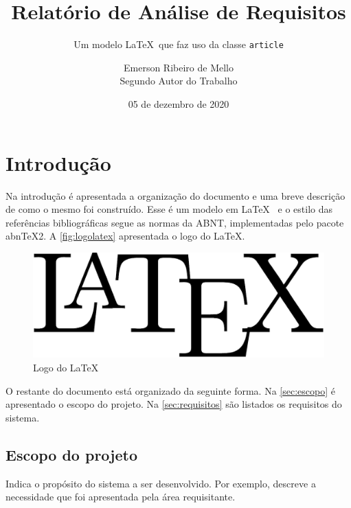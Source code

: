 \documentclass[11pt]{ifscarticle}
\title{Relatório de Análise de Requisitos}
\subtitle{Um modelo \LaTeX~que faz uso da classe \texttt{article}}
\author{Emerson Ribeiro de Mello \\[0.5em] Segundo Autor do Trabalho}
\date{05 de dezembro de 2020}
\begin{document}





\tableofcontents
\clearpage


\section{Introdução}
\label{sec:introducao}

Na introdução é apresentada a organização do documento e uma breve descrição de como o mesmo foi construído.   Esse é um modelo em \LaTeX~ \cite{lamport94} e o estilo das referências bibliográficas segue as normas da ABNT, implementadas pelo pacote abnTeX2. A \autoref{fig:logolatex} apresentada o logo do \LaTeX.

\begin{figure}[ht]
    \centering
    \includegraphics[width=.5\linewidth]{figuras/latex-logo}
    \caption{Logo do \LaTeX}
    \label{fig:logolatex}
\end{figure}

\lipsum[1]

O restante do documento está organizado da seguinte forma. Na \autoref{sec:escopo} é apresentado o escopo do projeto. Na \autoref{sec:requisitos} são listados os requisitos do sistema.

\subsection{Escopo do projeto}
\label{sec:escopo}

Indica o propósito do sistema a ser desenvolvido. Por exemplo, descreve a necessidade que foi apresentada pela área requisitante. \lipsum[2]
\end{document}
